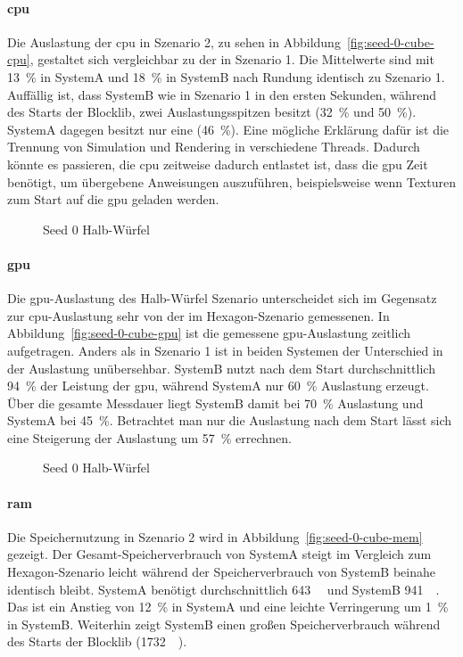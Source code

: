 \paragraph{\ac{cpu}} Die Auslastung der \ac{cpu} in Szenario 2, zu sehen in Abbildung~\vref{fig:seed-0-cube-cpu}, gestaltet sich vergleichbar zu der in Szenario 1. Die Mittelwerte sind mit \SI{13}{\percent} in SystemA und \SI{18}{\percent} in SystemB nach Rundung identisch zu Szenario 1.
Auffällig ist, dass SystemB wie in Szenario 1 in den ersten Sekunden, während des Starts der Blocklib, zwei Auslastungsspitzen besitzt (\SI{32}{\percent} und \SI{50}{\percent}). SystemA dagegen besitzt nur eine (\SI{46}{\percent}). Eine mögliche Erklärung dafür ist die Trennung von Simulation und Rendering in verschiedene Threads. Dadurch könnte es passieren, die \ac{cpu} zeitweise dadurch entlastet ist, dass die \ac{gpu} Zeit benötigt, um übergebene Anweisungen auszuführen, beispielsweise wenn Texturen zum Start auf die \ac{gpu} geladen werden.

\begin{figure}[!htb]
	\caption{Seed 0 Halb-Würfel}\label{fig:seed-0-cube-gpu}
\end{figure}
\paragraph{\ac{gpu}} Die \ac{gpu}-Auslastung des Halb-Würfel Szenario unterscheidet sich im Gegensatz zur \ac{cpu}-Auslastung sehr von der im Hexagon-Szenario gemessenen. In Abbildung~\vref{fig:seed-0-cube-gpu} ist die gemessene \ac{gpu}-Auslastung zeitlich aufgetragen. Anders als in Szenario 1 ist in beiden Systemen der Unterschied in der Auslastung unübersehbar. SystemB nutzt nach dem Start durchschnittlich \SI{94}{\percent} der Leistung der \ac{gpu}, während SystemA nur \SI{60}{\percent} Auslastung erzeugt. Über die gesamte Messdauer liegt SystemB damit bei \SI{70}{\percent} Auslastung und SystemA bei \SI{45}{\percent}. Betrachtet man nur die Auslastung nach dem Start lässt sich eine Steigerung der Auslastung um \SI{57}{\percent} errechnen.

\begin{figure}[!htb]
	\caption{Seed 0 Halb-Würfel}\label{fig:seed-0-cube-mem}
\end{figure} 
\paragraph{\ac{ram}} Die Speichernutzung in Szenario 2 wird in Abbildung~\vref{fig:seed-0-cube-mem} gezeigt. Der Ge\-samt-Spei\-cher\-ver\-brauch von SystemA steigt im Vergleich zum Hexagon-Szenario leicht während der Speicherverbrauch von SystemB beinahe identisch bleibt. SystemA benötigt durchschnittlich \SI{643}{\mega\byte} und SystemB \SI{941}{\mega\byte}. Das ist ein Anstieg von \SI{12}{\percent} in SystemA und eine leichte Verringerung um \SI{1}{\percent} in SystemB. Weiterhin zeigt SystemB einen großen Speicherverbrauch während des Starts der Blocklib (\SI{1732}{\mega\byte}).

